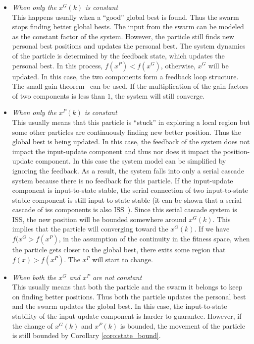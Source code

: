 \documentclass{sig-alternate}
\begin{document}
\begin{itemize}
\item \emph{When only the $ x^{G} (k) $ is constant} \\
This happens usually when a ``good'' global best is found.
Thus the swarm stops finding better global bests.
The input from the swarm can be modeled as the constant factor of the system. 
However, the particle still finds new personal best positions and updates the personal best.
The system dynamics of the particle is determined by the feedback state,
which updates the personal best.
In this process, $ f(x^{P}) < f(x^{G}) $, otherwise, $ x^{G} $ will be updated.
In this case, the two components form a feedback loop structure.
The small gain theorem~\cite{Jiang2001857} can be used.
If the multiplication of the gain factors of two components is less than $ 1 $, the system will still converge.
\item \emph{When only the $ x^{P} (k) $ is constant} \\
This usually means that this particle is ``stuck'' in exploring a local region but some other particles are continuously finding new better position. 
Thus the global best is being updated.
In this case, the feedback of the system does not impact the input-update component and thus nor does it impact the position-update component.
In this case the system model can be simplified by ignoring the feedback.
As a result, the system falls into only a serial cascade system because there is no feedback for this particle.
If the input-update component is input-to-state stable, the serial connection of two input-to-state stable component is still input-to-state stable (it can be shown that a serial cascade of iss components is also ISS~\cite{khalil1996nonlinear}).
Since this serial cascade system is ISS, the new position will be bounded somewhere around $ x^{G} (k) $. This implies that the particle will converging toward the $ x^{G} (k) $.
If we have  $ f(x^{G} > f(x^{P}) $, in the assumption of the continuity in the fitness space, when the particle gets closer to the global best, there exits some region that $ f(x) > f(x^{P}) $.
The $ x^{P} $ will start to change.
\item \emph{When both the $ x^{G} $ and $ x^{P} $ are not constant} \\
This usually means that both the particle and the swarm it belongs to keep on finding better positions.
Thus both the particle updates the personal best and the swarm updates the global best.
In this case, the input-to-state stability of the input-update component is harder to guarantee.
However, if the change of $ x^{G}(k) $ and $ x^{P}(k) $ is bounded, the movement of the particle is still bounded by Corollary \ref{coro:state_bound}.
\end{itemize}
\end{document}
